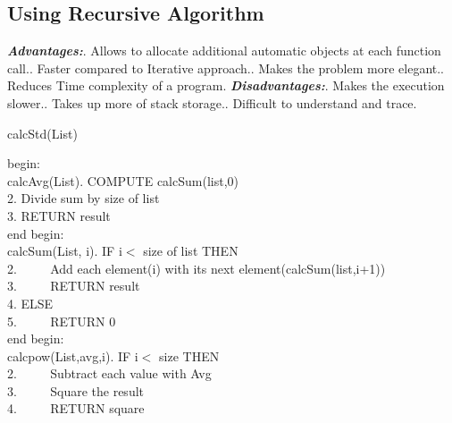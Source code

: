 \documentclass[a4paper,12pt]{article}
\begin{document}
\begin{titlepage}
\subsection{Using Recursive Algorithm}  
\textbf{\textit{Advantages:}}. Allows to allocate additional automatic objects at each function call.. Faster compared to Iterative approach.. Makes the problem more elegant.. Reduces Time complexity of a program.\newline
\newline
\textbf{\textit{Disadvantages:}}. Makes the execution slower.. Takes up more of stack storage.. Difficult to understand and trace.\newline
\begin{algorithm}
\caption{calcStd(List)}
begin:\\
calcAvg(List). COMPUTE calcSum(list,0)\\
2. Divide sum by size of list\\
3. RETURN result\\
end\newline
begin:\\
calcSum(List, i). IF i$<$ size of list THEN\\
2. $\hspace{2em}$ Add each element(i) with its next element(calcSum(list,i+1))\\
3. $\hspace{2em}$ RETURN result\\
4. ELSE\\
5. $\hspace{2em}$ RETURN 0\\
end\newline
begin:\\
calcpow(List,avg,i). IF i$<$ size THEN\\
2. $\hspace{2em}$ Subtract each value with Avg \\
3. $\hspace{2em}$ Square the result\\
4.  $\hspace{2em}$ RETURN square\\

\end{algorithm}
\end{titlepage}
\end{document}
